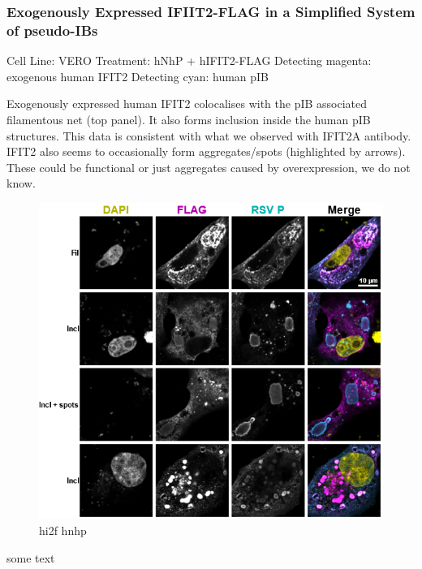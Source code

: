 \subsubsection{Exogenously Expressed IFIIT2-FLAG in a Simplified System of pseudo-IBs} \label{Exogenously Expressed IFIIT2-FLAG in a Simplified System of pseudo-IBs}
Cell Line: VERO \newline
Treatment: hNhP + hIFIT2-FLAG \newline
Detecting magenta: exogenous human IFIT2 \newline
Detecting cyan: human pIB \newline

Exogenously expressed human IFIT2 colocalises with the pIB associated filamentous net (top panel). It also forms inclusion inside the human pIB structures. This data is consistent with what we observed with IFIT2A antibody. IFIT2 also seems to occasionally form aggregates/spots (highlighted by arrows). These could be functional or just aggregates caused by overexpression, we do not know.

\begin{figure}
    \centering
    \includegraphics[width=1\linewidth]{09. Chapter 4//Figs//03. IFIT2-FLAG/02. hi2f hnhp.png}
    \caption[hi2f hnhp]{hi2f hnhp}
    \label{hi2f hnhp}
\end{figure}

some text

